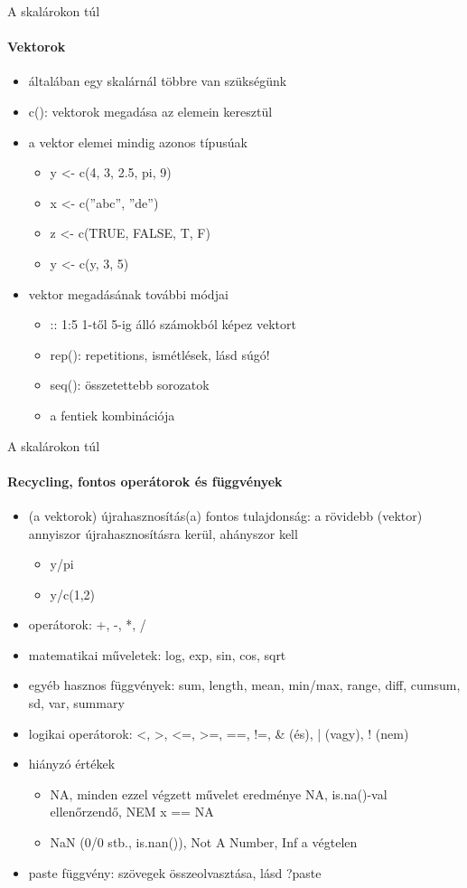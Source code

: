 \documentclass[10pt]{beamer}
\begin{document}
\begin{frame}{A skalárokon túl}
\framesubtitle{Vektorok}
\begin{itemize}
\item általában egy skalárnál többre van szükségünk
\item c(): vektorok megadása az elemein keresztül
\item a vektor elemei mindig azonos típusúak
\begin{itemize}
\item y <- c(4, 3, 2.5, pi, 9)
\item x <- c(''abc'', ''de'')
\item z <- c(TRUE, FALSE, T, F)
\item y <- c(y, 3, 5)
\end{itemize}
\item vektor megadásának további módjai
\begin{itemize}
\item :: 1:5 1-től 5-ig álló számokból képez vektort
\item rep(): repetitions, ismétlések, lásd súgó!
\item seq(): összetettebb sorozatok
\item a fentiek kombinációja
\end{itemize}
\end{itemize}
\end{frame}

\begin{frame}{A skalárokon túl}
\framesubtitle{Recycling, fontos operátorok és függvények}
\begin{itemize}
\item (a vektorok) újrahasznosítás(a) fontos tulajdonság: a rövidebb (vektor) annyiszor újrahasznosításra kerül, ahányszor kell
\begin{itemize}
\item y/pi
\item y/c(1,2)
\end{itemize}
\item operátorok: +, -, *, /
\item matematikai műveletek: log, exp, sin, cos, sqrt
\item egyéb hasznos függvények: sum, length, mean, min/max, range, diff, cumsum, sd, var, summary
\item logikai operátorok: <, >, <=, >=, ==, !=, \& (és), | (vagy), ! (nem)
\item hiányzó értékek
\begin{itemize}
\item NA, minden ezzel végzett művelet eredménye NA, is.na()-val ellenőrzendő, NEM x == NA
\item NaN (0/0 stb., is.nan()), Not A Number, Inf a végtelen
\end{itemize}
\item paste függvény: szövegek összeolvasztása, lásd ?paste
\end{itemize}
\end{frame}
\end{document}
